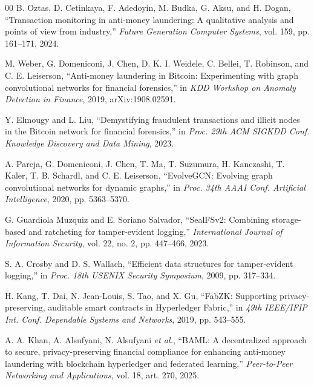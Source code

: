 \documentclass[conference]{IEEEtran}
\begin{document}
\begin{thebibliography}{00}
\scriptsize
\setlength{\itemsep}{0pt plus 0.3pt}
B. Oztas, D. Cetinkaya, F. Adedoyin, M. Budka, G. Aksu, and H. Dogan,
``Transaction monitoring in anti-money laundering: A qualitative analysis and
points of view from industry,'' \emph{Future Generation Computer Systems},
vol. 159, pp. 161--171, 2024.


M. Weber, G. Domeniconi, J. Chen, D. K. I. Weidele, C. Bellei, T. Robinson, and
C. E. Leiserson, ``Anti-money laundering in Bitcoin: Experimenting with graph
convolutional networks for financial forensics,'' in \emph{KDD Workshop on
Anomaly Detection in Finance}, 2019, arXiv:1908.02591.

Y. Elmougy and L. Liu, ``Demystifying fraudulent transactions and illicit nodes
in the Bitcoin network for financial forensics,'' in \emph{Proc. 29th ACM SIGKDD
Conf. Knowledge Discovery and Data Mining}, 2023.

A. Pareja, G. Domeniconi, J. Chen, T. Ma, T. Suzumura, H. Kanezashi, T. Kaler,
T. B. Schardl, and C. E. Leiserson, ``EvolveGCN: Evolving graph convolutional
networks for dynamic graphs,'' in \emph{Proc. 34th AAAI Conf. Artificial
Intelligence}, 2020, pp. 5363--5370.

G. Guardiola Muzquiz and E. Soriano Salvador, ``SealFSv2: Combining
storage-based and ratcheting for tamper-evident logging,'' \emph{International
Journal of Information Security}, vol. 22, no. 2, pp. 447--466, 2023.

S. A. Crosby and D. S. Wallach, ``Efficient data structures for tamper-evident
logging,'' in \emph{Proc. 18th USENIX Security Symposium}, 2009, pp. 317--334.

H. Kang, T. Dai, N. Jean-Louis, S. Tao, and X. Gu, ``FabZK: Supporting
privacy-preserving, auditable smart contracts in Hyperledger Fabric,'' in
\emph{49th IEEE/IFIP Int. Conf. Dependable Systems and Networks}, 2019,
pp. 543--555.

A. A. Khan, A. Alsufyani, N. Alsufyani \emph{et al.}, ``BAML: A decentralized
approach to secure, privacy-preserving financial compliance for enhancing
anti-money laundering with blockchain hyperledger and federated learning,''
\emph{Peer-to-Peer Networking and Applications}, vol. 18, art. 270, 2025.


\end{thebibliography}
\end{document}

